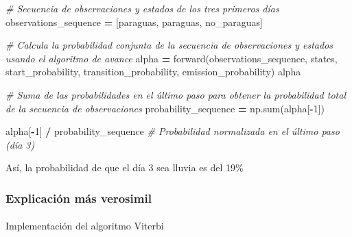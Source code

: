 \documentclass[
  a4paper,
  DIV=11,
  numbers=noendperiod]{scrreprt}
\makeatletter
\let\oldparagraph\paragraph
\renewcommand{\paragraph}{
    \@ifstar
      \xxxParagraphStar
      \xxxParagraphNoStar
  }
\newcommand{\xxxParagraphStar}[1]{\oldparagraph*{#1}\mbox{}}
\newcommand{\xxxParagraphNoStar}[1]{\oldparagraph{#1}\mbox{}}
\newenvironment{Shaded}{\begin{snugshade}}{\end{snugshade}}
\newcommand{\BuiltInTok}[1]{#1}
\newcommand{\CommentTok}[1]{\textcolor[rgb]{0.56,0.35,0.01}{\textit{#1}}}
\newcommand{\DecValTok}[1]{\textcolor[rgb]{0.00,0.00,0.81}{#1}}
\newcommand{\NormalTok}[1]{#1}
\newcommand{\OperatorTok}[1]{\textcolor[rgb]{0.81,0.36,0.00}{\textbf{#1}}}
\newcommand{\StringTok}[1]{\textcolor[rgb]{0.31,0.60,0.02}{#1}}
\makeatother
\begin{document}
\begin{Shaded}
\begin{Highlighting}[numbers=left,,]
\CommentTok{\# Secuencia de observaciones y estados de los tres primeros días}
\NormalTok{observations\_sequence }\OperatorTok{=}\NormalTok{ [}\StringTok{\textquotesingle{}paraguas\textquotesingle{}}\NormalTok{, }\StringTok{\textquotesingle{}paraguas\textquotesingle{}}\NormalTok{, }\StringTok{\textquotesingle{}no\_paraguas\textquotesingle{}}\NormalTok{]}

\CommentTok{\# Calcula la probabilidad conjunta de la secuencia de observaciones y estados usando el algoritmo de avance}
\NormalTok{alpha }\OperatorTok{=}\NormalTok{ forward(observations\_sequence, states, start\_probability, transition\_probability, emission\_probability)}
\NormalTok{alpha}
\end{Highlighting}
\end{Shaded}

\begin{Shaded}
\begin{Highlighting}[numbers=left,,]
\CommentTok{\# Suma de las probabilidades en el último paso para obtener la probabilidad total de la secuencia de observaciones}
\NormalTok{probability\_sequence }\OperatorTok{=}\NormalTok{ np.}\BuiltInTok{sum}\NormalTok{(alpha[}\OperatorTok{{-}}\DecValTok{1}\NormalTok{])}
\end{Highlighting}
\end{Shaded}

\begin{Shaded}
\begin{Highlighting}[numbers=left,,]
\NormalTok{alpha[}\OperatorTok{{-}}\DecValTok{1}\NormalTok{] }\OperatorTok{/}\NormalTok{ probability\_sequence }\CommentTok{\# Probabilidad normalizada en el último paso (día 3)}
\end{Highlighting}
\end{Shaded}

Así, la probabilidad de que el día 3 sea lluvia es del 19\%

\subsubsection{Explicación más
verosimil}\label{explicaciuxf3n-muxe1s-verosimil}

\paragraph{Implementación del algoritmo
Viterbi}\label{implementaciuxf3n-del-algoritmo-viterbi}
\end{document}
